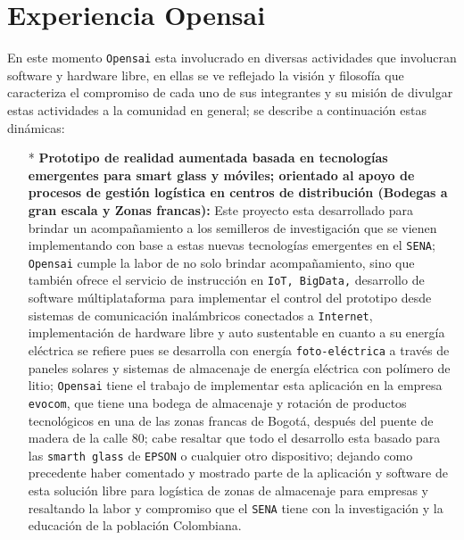 \documentclass[jou]{apa6} %
\begin{document}
\section{Experiencia Opensai}

En este momento \texttt{Opensai} esta involucrado en diversas actividades que involucran software y hardware libre, en ellas se ve reflejado la visión y filosofía que caracteriza el compromiso de cada uno de sus integrantes y su misión de divulgar estas actividades a la comunidad en general; se describe a continuación estas dinámicas:

\begin{enumerate}
\item[*] \textbf{Prototipo de realidad aumentada basada en tecnologías emergentes para smart glass y móviles; orientado al apoyo de procesos de gestión logística en centros de distribución (Bodegas a gran escala y Zonas francas):} Este proyecto esta desarrollado para brindar un acompañamiento a los semilleros de investigación que se vienen implementando con base a estas nuevas tecnologías emergentes en el \texttt{SENA}; \texttt{Opensai} cumple la labor de no solo brindar acompañamiento, sino que también ofrece el servicio de instrucción en \texttt{IoT, BigData,} desarrollo de software múltiplataforma para implementar el control del prototipo desde sistemas de comunicación inalámbricos conectados a \texttt{Internet}, implementación de hardware libre y auto sustentable  en cuanto a su energía eléctrica se refiere pues se desarrolla con energía \texttt{foto-eléctrica} a través de paneles solares y sistemas de almacenaje de energía eléctrica con polímero de litio; \texttt{Opensai} tiene el trabajo de implementar esta aplicación en la empresa \texttt{evocom}, que tiene una bodega de almacenaje y rotación de productos tecnológicos en una de las zonas francas de Bogotá, después del puente de madera de la calle 80; cabe resaltar que todo el desarrollo esta basado para las \texttt{smarth glass} de \texttt{EPSON} o cualquier otro dispositivo; dejando como precedente haber comentado y mostrado parte de la aplicación y software de esta solución libre para logística de zonas de almacenaje para empresas y resaltando la labor y compromiso que el   \texttt{SENA} tiene con la investigación y la educación de la población Colombiana.


\end{enumerate}
\end{document}
